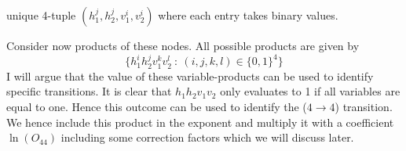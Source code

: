 \documentclass{article}
\begin{document}
unique 4-tuple $(h^j_1,h^j_2, v^i_1,v^i_2)$ where each entry takes binary
values.  \par
Consider now products of these nodes. All possible products are given by
\begin{equation}
    \{ h_1^i h_2^j v_1^k v_2^l \: : \: (i,j,k,l)\in \{0,1\}^4 \}
\end{equation}
I will argue that the value of these variable-products can be used to identify
specific transitions. It is clear that $h_1h_2v_1v_2$ only evaluates to 1 if all
variables are equal to one. Hence this outcome can be used to identify the
($4\rightarrow4$) transition. We hence include this product in the exponent and
multiply it with a coefficient $\ln{(O_{44})}$ including some correction factors
which we will discuss later.
\end{document}
